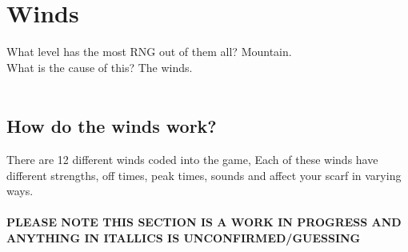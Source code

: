 \section{Winds}



What level has the most RNG out of them all? Mountain. \\
What is the cause of this? The winds.\\
\\
\subsection*{How do the winds work?}
There are 12 different winds coded into the game, Each of these winds have different strengths, off times, peak times, sounds and affect your scarf in varying ways.\\
\\
\textbf{PLEASE NOTE THIS SECTION IS A WORK IN PROGRESS AND ANYTHING IN ITALLICS IS UNCONFIRMED/GUESSING}\\
